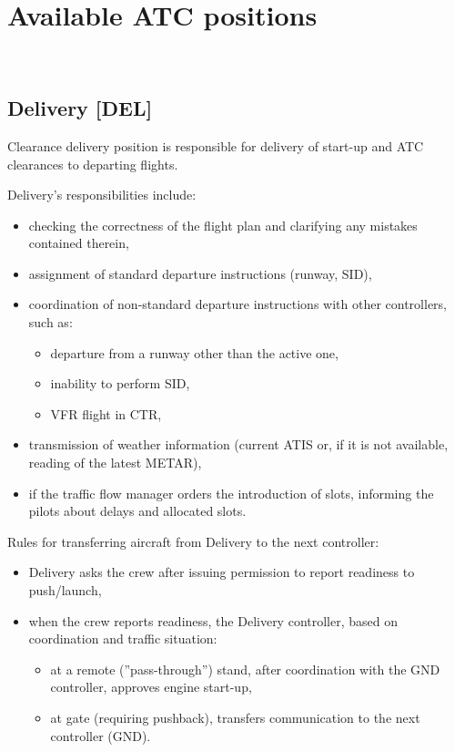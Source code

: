 \chapter{Available ATC positions}\
\section{Delivery [DEL]}

Clearance delivery position is responsible for delivery of start-up and ATC clearances to departing flights.

Delivery's responsibilities include:
\begin{itemize}
    \item checking the correctness of the flight plan and clarifying any mistakes contained therein,
    \item assignment of standard departure instructions (runway, SID),
    \item coordination of non-standard departure instructions with other controllers, such as:
    \begin{itemize}
        \item departure from a runway other than the active one,
        \item inability to perform SID,
        \item VFR flight in CTR,
    \end{itemize}
    \item transmission of weather information (current ATIS or, if it is not available, reading of the latest METAR),
    \item if the traffic flow manager orders the introduction of slots, informing the pilots about delays and allocated slots.
\end{itemize}

Rules for transferring aircraft from Delivery to the next controller:
\begin{itemize}
    \item Delivery asks the crew after issuing permission to report readiness to push/launch,
    \item when the crew reports readiness, the Delivery controller, based on coordination and traffic situation:
    \begin{itemize}
        \item at a remote (''pass-through'') stand, after coordination with the GND controller, approves engine start-up,
        \item at gate (requiring pushback), transfers communication to the next controller (GND).
    \end{itemize}
\end{itemize}

